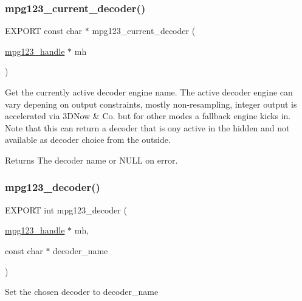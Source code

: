 \subsubsection{\texorpdfstring{mpg123\+\_\+current\+\_\+decoder()}{mpg123\_current\_decoder()}}
{\footnotesize\ttfamily E\+X\+P\+O\+RT const char $\ast$ mpg123\+\_\+current\+\_\+decoder (\begin{DoxyParamCaption}\item[{\hyperlink{group__mpg123__init_ga6728e2839a395f3a07d4514da659faca}{mpg123\+\_\+handle} $\ast$}]{mh }\end{DoxyParamCaption})}

Get the currently active decoder engine name. The active decoder engine can vary depening on output constraints, mostly non-\/resampling, integer output is accelerated via 3\+D\+Now \& Co. but for other modes a fallback engine kicks in. Note that this can return a decoder that is ony active in the hidden and not available as decoder choice from the outside. \begin{DoxyReturn}{Returns}
The decoder name or N\+U\+LL on error. 
\end{DoxyReturn}
\mbox{\label{group__mpg123__decoder_ga44229d1ae46066bf06ea4cd0867848a1}} 
\subsubsection{\texorpdfstring{mpg123\+\_\+decoder()}{mpg123\_decoder()}}
{\footnotesize\ttfamily E\+X\+P\+O\+RT int mpg123\+\_\+decoder (\begin{DoxyParamCaption}\item[{\hyperlink{group__mpg123__init_ga6728e2839a395f3a07d4514da659faca}{mpg123\+\_\+handle} $\ast$}]{mh,  }\item[{const char $\ast$}]{decoder\+\_\+name }\end{DoxyParamCaption})}

Set the chosen decoder to \textquotesingle{}decoder\+\_\+name\textquotesingle{} \mbox{\label{group__mpg123__decoder_ga3e8b169646870ff0848840c6f555ce6f}} 
